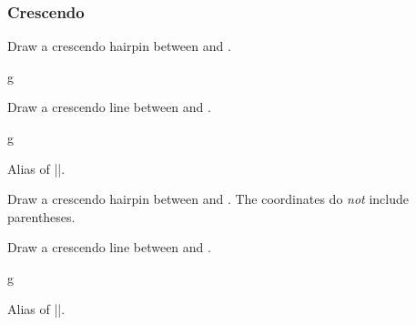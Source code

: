 \subsubsection{Crescendo}\label{sec:line:cresc-dim:cresc}
\begin{command}{\tmcrescendohairpin{}}
  Draw a crescendo hairpin between  and .
\end{command}
\begin{codeexample}[]
\begin{tmline}
\begin{tmstaff}{g}{}
    
    
\end{tmstaff}
\end{tmline}
\end{codeexample}
\begin{command}{\tmcrescendoline{}}
  Draw a crescendo line between  and .
\end{command}
\begin{codeexample}[]
\begin{tmline}
  \begin{tmstaff}{g}{}
  \end{tmstaff}
\end{tmline}
\end{codeexample}
\begin{command}{\tmcrescendo{}}
  Alias of |\tmcrescendohairpin|.
\end{command}
\begin{command}{\tmcrescendohairpincoordinate{}}
  Draw a crescendo hairpin between  and . 
  The coordinates do \emph{not} include parentheses.
\end{command}
\begin{command}{\tmcrescendolinecoordinate{}}
  Draw a crescendo line between  and .
\end{command}
\begin{codeexample}[]
\begin{tmline}
\begin{tmstaff}{g}{}
\end{tmstaff}
\end{tmline}
\end{codeexample}
\begin{command}{\tmcrescendocoordinate{}}
  Alias of |\tmcrescendohairpincoordinate|.
\end{command}
